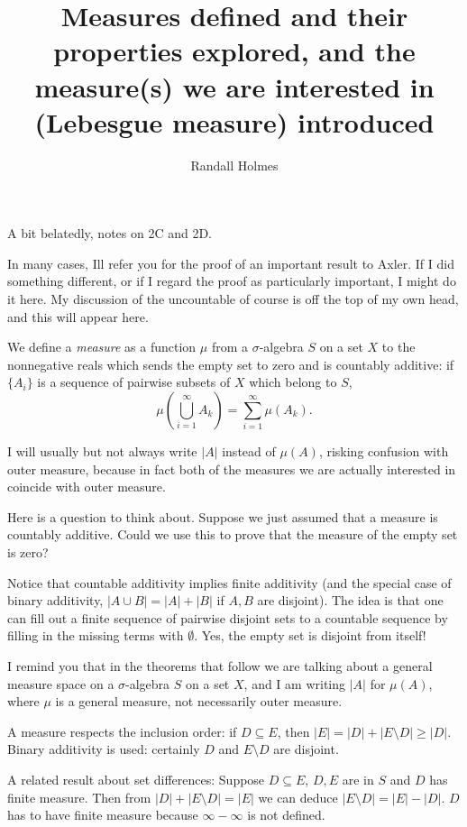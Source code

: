 \documentclass[12pt]{article}
\title{Measures defined and their properties explored, and the measure(s) we are interested in (Lebesgue measure) introduced}
\author{Randall Holmes}
\begin{document}
\maketitle

A bit belatedly, notes on 2C and 2D.

In many cases, Ill refer you for the proof of an important result to Axler.  If I did something different, or if I regard the proof as particularly important, I might do it here.
My discussion of the uncountable of course is off the top of my own head, and this will appear here.

We define a {\em measure\/} as a function $\mu$ from a $\sigma$-algebra $S$ on a set $X$ to the nonnegative reals which sends the empty set to zero and is countably additive:
if $\{A_i\}$ is a sequence of pairwise subsets of $X$ which belong to $S$, $$\mu(\bigcup_{i=1}^{\infty} A_k) = \sum_{i=1}^{\infty}\mu(A_k).$$

I will usually but not always write $|A|$ instead of $\mu(A)$, risking confusion with outer measure, because in fact both of the measures we are actually interested in coincide with outer measure.

Here is a question to think about.  Suppose we just assumed that a measure is countably additive.  Could we use this to prove that the measure of the empty set is zero?

Notice that countable additivity implies finite additivity (and the special case of binary additivity, $|A \cup B| = |A| + |B|$ if $A,B$ are disjoint).  The idea is that one can fill out a finite sequence of pairwise disjoint sets to a countable sequence by filling in the missing terms with $\emptyset$.  Yes, the empty set is disjoint from itself!

I remind you that in the theorems that follow we are talking about a general measure space on a $\sigma$-algebra $S$ on a set $X$, and I am writing $|A|$ for $\mu(A)$, where $\mu$ is a general measure, not necessarily outer measure.

A measure respects the inclusion order:  if $D \subseteq E$, then $|E| = |D| + |E \setminus D| \geq |D|$.  Binary additivity is used:  certainly $D$ and $E \setminus D$ are disjoint.

A related result about set differences:  Suppose $D\subseteq E$, $D,E$ are in $S$ and $D$ has finite measure.  Then from $|D|+|E \setminus D| = |E|$ we can deduce
$|E \setminus D| = |E|-|D|$.  $D$ has to have finite measure because $\infty - \infty$ is not defined.
\end{document}
